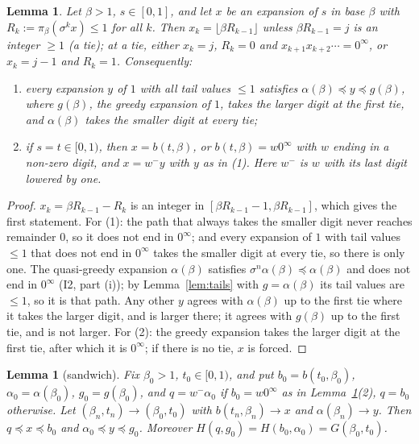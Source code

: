 \documentclass[11pt]{amsart}
\newtheorem{lemma}[theorem]{Lemma}
\theoremstyle{definition}
\theoremstyle{remark}
\newcommand{\lex}{\preccurlyeq}
\begin{document}
\begin{lemma}\label{lem:ties}
Let $\beta>1$, $s\in[0,1]$, and let $x$ be an expansion of $s$ in base $\beta$ with $R_k:=\pi_\beta(\sigma^kx)\le1$ for all $k$. Then $x_k=\lfloor\beta R_{k-1}\rfloor$ unless $\beta R_{k-1}=j$ is an integer $\ge1$ (a tie); at a tie, either $x_k=j$, $R_k=0$ and $x_{k+1}x_{k+2}\cdots=0^\infty$, or $x_k=j-1$ and $R_k=1$. Consequently:
\begin{enumerate}
\item every expansion $y$ of $1$ with all tail values $\le1$ satisfies $\alpha(\beta)\lex y\lex g(\beta)$, where $g(\beta)$, the greedy expansion of $1$, takes the larger digit at the first tie, and $\alpha(\beta)$ takes the smaller digit at every tie;
\item if $s=t\in[0,1)$, then $x=b(t,\beta)$, or $b(t,\beta)=w0^\infty$ with $w$ ending in a non-zero digit, and $x=w^-y$ with $y$ as in (1). Here $w^-$ is $w$ with its last digit lowered by one.
\end{enumerate}
\end{lemma}

\begin{proof}
$x_k=\beta R_{k-1}-R_k$ is an integer in $[\beta R_{k-1}-1,\beta R_{k-1}]$, which gives the first statement. For (1): the path that always takes the smaller digit never reaches remainder $0$, so it does not end in $0^\infty$; and every expansion of $1$ with tail values $\le1$ that does not end in $0^\infty$ takes the smaller digit at every tie, so there is only one. The quasi-greedy expansion $\alpha(\beta)$ satisfies $\sigma^n\alpha(\beta)\lex\alpha(\beta)$ and does not end in $0^\infty$ (I2, part (i)); by Lemma~\ref{lem:tails} with $g=\alpha(\beta)$ its tail values are $\le1$, so it is that path. Any other $y$ agrees with $\alpha(\beta)$ up to the first tie where it takes the larger digit, and is larger there; it agrees with $g(\beta)$ up to the first tie, and is not larger. For (2): the greedy expansion takes the larger digit at the first tie, after which it is $0^\infty$; if there is no tie, $x$ is forced.
\end{proof}

\begin{lemma}[sandwich]\label{lem:sandwich}
Fix $\beta_0>1$, $t_0\in[0,1)$, and put $b_0=b(t_0,\beta_0)$, $\alpha_0=\alpha(\beta_0)$, $g_0=g(\beta_0)$, and $q=w^-\alpha_0$ if $b_0=w0^\infty$ as in Lemma~\ref{lem:ties}(2), $q=b_0$ otherwise. Let $(\beta_n,t_n)\to(\beta_0,t_0)$ with $b(t_n,\beta_n)\to x$ and $\alpha(\beta_n)\to y$. Then $q\lex x\lex b_0$ and $\alpha_0\lex y\lex g_0$. Moreover $H(q,g_0)=H(b_0,\alpha_0)=G(\beta_0,t_0)$.
\end{lemma}
\end{document}
